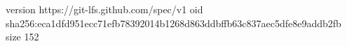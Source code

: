 version https://git-lfs.github.com/spec/v1
oid sha256:eca1dfd951ecc71efb78392014b1268d863ddbffb63c837aec5dfe8e9addb2fb
size 152
